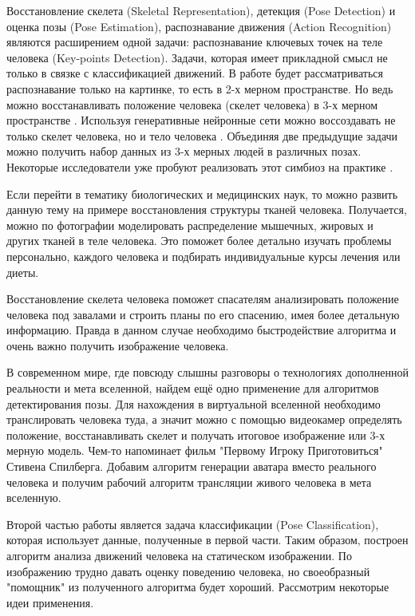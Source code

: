 Восстановление скелета (Skeletal Representation), детекция (Pose De\-te\-ction) и оценка позы (Pose Estimation), распознавание движения (Action Recognition) являются расширением одной задачи: распознавание ключевых точек на теле человека (Key-points Detection). Задачи, которая имеет прикладной смысл не только в связке с классификацией движений. В работе  будет рассматриваться распознавание только на картинке, то есть в 2-х мерном пространстве. Но ведь можно восстанавливать положение человека (скелет человека) в 3-х мерном пространстве \cite{WANG2021103225, 8100086}. Используя генеративные нейронные сети можно воссоздавать не только скелет человека, но и тело человека \cite{Zhang_2017_CVPR}. Объединяя две предыдущие задачи можно получить набор данных из 3-х мерных людей в различных позах. Некоторые исследователи уже пробуют реализовать этот симбиоз на практике \cite{varol17_surreal}.

Если перейти в тематику биологических и медицинских наук, то можно развить данную тему на примере восстановления структуры тканей человека. Получается, можно по фотографии моделировать распределение мышечных, жировых и других тканей в теле человека. Это поможет более детально изучать проблемы персонально, каждого человека и подбирать индивидуальные курсы лечения или диеты.

Восстановление скелета человека поможет спасателям анализировать положение человека под завалами и строить планы по его спасению, имея более детальную информацию. Правда в данном случае необходимо быстродействие алгоритма и очень важно получить изображение человека.

В современном мире, где повсюду слышны разговоры о технологиях дополненной реальности и мета вселенной, найдем ещё одно применение для алгоритмов детектирования позы. Для нахождения в виртуальной вселенной необходимо транслировать человека туда, а значит можно с помощью видеокамер определять положение, восстанавливать скелет и получать итоговое изображение или 3-х мерную модель. Чем-то напоминает фильм "Первому Игроку Приготовиться"{} Стивена Спилберга. Добавим алгоритм генерации аватара вместо реального человека и получим рабочий алгоритм трансляции живого человека в мета вселенную.

\hfill \break
Второй частью работы является задача классификации (Pose Classi\-fi\-ca\-tion), которая использует данные, полученные в первой части. Таким образом, построен алгоритм анализа движений человека на статическом изображении. По изображению трудно давать оценку поведению человека, но своеобразный "помощник"{} из полученного алгоритма будет хороший. Рассмотрим некоторые идеи применения.

